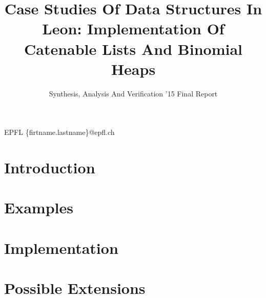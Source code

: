 \documentclass[nocopyrightspace,11pt,authoryear,preprint]{sigplanconf}
\begin{document}


\title{Case Studies Of Data Structures In Leon: Implementation Of Catenable Lists And Binomial Heaps}
\subtitle{Synthesis, Analysis And Verification '15 Final Report}

           {EPFL}
           {\{firtname.lastname\}@epfl.ch}

\maketitle

\section{Introduction}


\section{Examples}


\section{Implementation}


\section{Possible Extensions}




\end{document}
